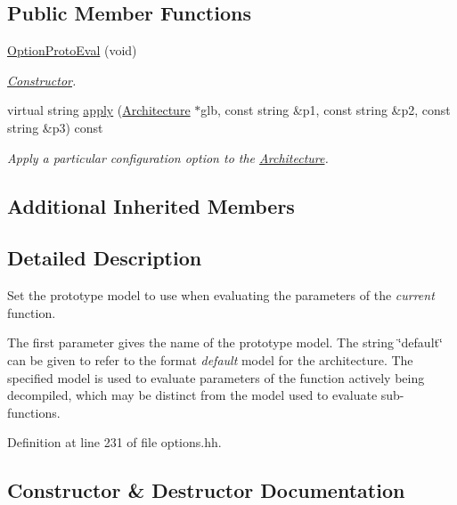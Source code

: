 \subsection*{Public Member Functions}
\begin{DoxyCompactItemize}
\item 
\mbox{\hyperlink{class_option_proto_eval_a2e15daebeb98151e3109884db3a783c5}{Option\+Proto\+Eval}} (void)
\begin{DoxyCompactList}\small\item\em \mbox{\hyperlink{class_constructor}{Constructor}}. \end{DoxyCompactList}\item 
virtual string \mbox{\hyperlink{class_option_proto_eval_a8fd059a29b0abecc4e5f3a9e55661621}{apply}} (\mbox{\hyperlink{class_architecture}{Architecture}} $\ast$glb, const string \&p1, const string \&p2, const string \&p3) const
\begin{DoxyCompactList}\small\item\em Apply a particular configuration option to the \mbox{\hyperlink{class_architecture}{Architecture}}. \end{DoxyCompactList}\end{DoxyCompactItemize}
\subsection*{Additional Inherited Members}


\subsection{Detailed Description}
Set the prototype model to use when evaluating the parameters of the {\itshape current} function. 

The first parameter gives the name of the prototype model. The string \char`\"{}default\char`\"{} can be given to refer to the format {\itshape default} model for the architecture. The specified model is used to evaluate parameters of the function actively being decompiled, which may be distinct from the model used to evaluate sub-\/functions. 

Definition at line 231 of file options.\+hh.



\subsection{Constructor \& Destructor Documentation}
\mbox{\label{class_option_proto_eval_a2e15daebeb98151e3109884db3a783c5}} 
